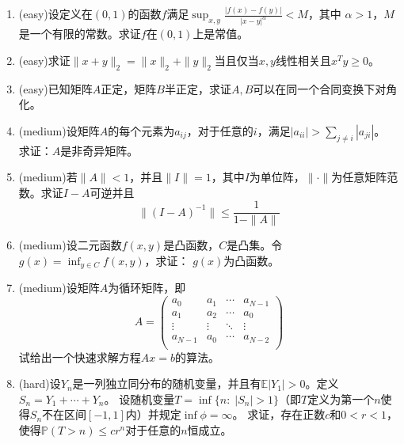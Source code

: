 \documentclass[a4paper]{article}
\begin{document}
\begin{enumerate}
\item (easy)设定义在$(0,1)$的函数$f$满足$\sup_{x,y}\frac{|f(x)-f(y)|}{|x-y|^\alpha}<M$，其中
$\alpha>1$，$M$是一个有限的常数。求证$f$在$(0,1)$上是常值。
\item (easy)求证$\|x+y\|_2=\|x\|_2+\|y\|_2$当且仅当$x,y$线性相关且$x^Ty\geqslant 0$。
\item (easy)已知矩阵$A$正定，矩阵$B$半正定，求证$A,B$可以在同一个合同变换下对角化。
\item (medium)设矩阵$A$的每个元素为$a_{ij}$，对于任意的$i$，满足$|a_{ii}|>\sum_{j\neq i}{|a_{ji}|}$。
求证：$A$是非奇异矩阵。
\item (medium)若$\|A\|<1$，并且$\|I\|=1$，其中$I$为单位阵，$\|\cdot\|$为任意矩阵范数。求证$I-A$可逆并且
\begin{equation}
\|(I-A)^{-1}\|\leqslant \frac{1}{1-\|A\|}
\end{equation}
\item (medium)设二元函数$f(x,y)$是凸函数，$C$是凸集。令$g(x)=\inf_{y\in C}f(x,y)$，求证：
$g(x)$为凸函数。
\item (medium)设矩阵$A$为循环矩阵，即
\begin{equation}
A=\left(\begin{array}{cccc}
a_0 & a_1 & \cdots & a_{N-1} \\
a_1 & a_2 & \cdots & a_0     \\
\vdots & \vdots & \ddots & \vdots \\
a_{N-1} & a_0 & \cdots & a_{N-2} \\
\end{array}
\right)
\end{equation}
试给出一个快速求解方程$Ax=b$的算法。
\item (hard)设$Y_n$是一列独立同分布的随机变量，并且有$\mathbb{E}|Y_1|>0$。定义$S_n=Y_1+\cdots+Y_n$。
设随机变量$T=\inf\{n:\; |S_n|>1 \}$（即$T$定义为第一个$n$使得$S_n$不在区间$[-1,1]$内）并规定$\inf\phi=\infty$。
求证，存在正数$c$和$0<r<1$，使得$\mathbb{P}(T>n)\leqslant cr^n$对于任意的$n$恒成立。
\end{enumerate}
\end{document}
